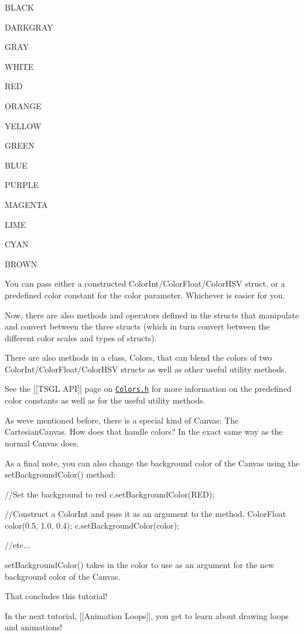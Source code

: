 \begin{DoxyItemize}
\item {\ttfamily B\+L\+A\+C\+K}
\item {\ttfamily D\+A\+R\+K\+G\+R\+A\+Y}
\item {\ttfamily G\+R\+A\+Y}
\item {\ttfamily W\+H\+I\+T\+E}
\item {\ttfamily R\+E\+D}
\item {\ttfamily O\+R\+A\+N\+G\+E}
\item {\ttfamily Y\+E\+L\+L\+O\+W}
\item {\ttfamily G\+R\+E\+E\+N}
\item {\ttfamily B\+L\+U\+E}
\item {\ttfamily P\+U\+R\+P\+L\+E}
\item {\ttfamily M\+A\+G\+E\+N\+T\+A}
\item {\ttfamily L\+I\+M\+E}
\item {\ttfamily C\+Y\+A\+N}
\item {\ttfamily B\+R\+O\+W\+N}
\end{DoxyItemize}

You can pass either a constructed Color\+Int/\+Color\+Float/\+Color\+H\+S\+V struct, or a predefined color constant for the color parameter. Whichever is easier for you.

Now, there are also methods and operators defined in the structs that manipulate and convert between the three structs (which in turn convert between the different color scales and types of structs).

There are also methods in a class, Colors, that can blend the colors of two Color\+Int/\+Color\+Float/\+Color\+H\+S\+V structs as well as other useful utility methods.

See the \mbox{[}\mbox{[}T\+S\+G\+L A\+P\+I\mbox{]}\mbox{]} page on \href{http://calvin-cs.github.io/TSGL/html/classtsgl_1_1_colors.html}{\tt Colors.\+h} for more information on the predefined color constants as well as for the useful utility methods.

As we\textquotesingle{}ve mentioned before, there is a special kind of Canvas\+: The Cartesian\+Canvas. How does that handle colors? In the exact same way as the normal Canvas does.

As a final note, you can also change the background color of the Canvas using the set\+Background\+Color() method\+:


\begin{DoxyCode}
\textcolor{comment}{//Set the background to red}
  c.setBackgroundColor(RED);

\textcolor{comment}{//Construct a ColorInt and pass it as an argument to the method.}
  ColorFloat color(0.5, 1.0, 0.4);
  c.setBackgroundColor(color);

\textcolor{comment}{//etc...}
\end{DoxyCode}


set\+Background\+Color() takes in the color to use as an argument for the new background color of the Canvas.

That concludes this tutorial!

In the next tutorial, \mbox{[}\mbox{[}Animation Loops\mbox{]}\mbox{]}, you get to learn about drawing loops and animations! 